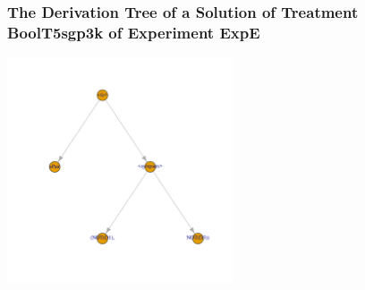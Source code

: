  \begin{frame}
 \frametitle{ The Derivation Tree of a Solution of Treatment BoolT5sgp3k of Experiment ExpE }
 \begin{center}
\includegraphics[width=0.5\textwidth, angle=0]
{ExpEDerivationTreeFigure006.pdf}
 \end{center}
 \label{report/ExpEDerivationTreeFigure006.pdf}  
 \end{frame}

